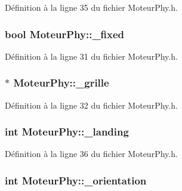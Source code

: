 Définition à la ligne 35 du fichier MoteurPhy.h.

\hypertarget{a00013_a017cb4047a99eb1d77a00b809dddb316}{
\subsubsection[{\_\-fixed}]{\setlength{\rightskip}{0pt plus 5cm}bool {\bf MoteurPhy::\_\-fixed}}}
\label{a00013_a017cb4047a99eb1d77a00b809dddb316}


Définition à la ligne 31 du fichier MoteurPhy.h.

\hypertarget{a00013_adb5aaa4c6afc40fb635dab1ae6903bab}{
\subsubsection[{\_\-grille}]{$\ast$ {\bf MoteurPhy::\_\-grille}}}
\label{a00013_adb5aaa4c6afc40fb635dab1ae6903bab}


Définition à la ligne 32 du fichier MoteurPhy.h.

\hypertarget{a00013_ae60dc40b758975f2259c162647f934b3}{
\subsubsection[{\_\-landing}]{\setlength{\rightskip}{0pt plus 5cm}int {\bf MoteurPhy::\_\-landing}}}
\label{a00013_ae60dc40b758975f2259c162647f934b3}


Définition à la ligne 36 du fichier MoteurPhy.h.

\hypertarget{a00013_a00fd8bca4af06999915a03b221d06141}{
\subsubsection[{\_\-orientation}]{\setlength{\rightskip}{0pt plus 5cm}int {\bf MoteurPhy::\_\-orientation}}}
\label{a00013_a00fd8bca4af06999915a03b221d06141}



